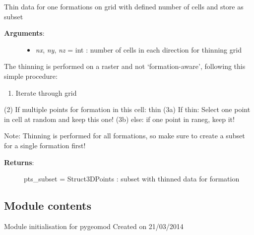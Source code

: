 \documentclass[letterpaper,10pt,english]{sphinxmanual}
\begin{document}
\begin{fulllineitems}
\begin{fulllineitems}
\begin{description}
\begin{itemize}
\end{itemize}

\end{description}

\end{fulllineitems}


\begin{fulllineitems}
\label{pygeomod:pygeomod.struct_data.Struct3DPoints.thin}
Thin data for one formations on grid with defined number of cells and store as subset
\begin{description}
\item[{\textbf{Arguments}:}] \leavevmode\begin{itemize}
\item {} 
\emph{nx}, \emph{ny}, \emph{nz} = int : number of cells in each direction for thinning grid

\end{itemize}

\end{description}

The thinning is performed on a raster and not `formation-aware', 
following this simple procedure:
\begin{enumerate}
\item {} 
Iterate through grid

\end{enumerate}

(2) If multiple points for formation in this cell: thin
(3a) If thin: Select one point in cell at random and keep this one!
(3b) else: if one point in raneg, keep it!

Note: Thinning is performed for all formations, so make sure to create a subset
for a single formation first!
\begin{description}
\item[{\textbf{Returns}:}] \leavevmode
pts\_subset = Struct3DPoints : subset with thinned data for formation

\end{description}

\end{fulllineitems}


\end{fulllineitems}



\subsection{Module contents}
\label{pygeomod:module-pygeomod}\label{pygeomod:module-contents}
Module initialisation for pygeomod
Created on 21/03/2014
\end{document}
